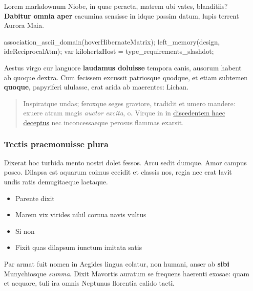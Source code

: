 \documentclass[
]{tufte-pandoc}
\newenvironment{Shaded}{}{}
\newcommand{\DataTypeTok}[1]{\textcolor[rgb]{0.56,0.13,0.00}{#1}}
\newcommand{\FunctionTok}[1]{\textcolor[rgb]{0.02,0.16,0.49}{#1}}
\newcommand{\NormalTok}[1]{#1}
\newcommand{\OperatorTok}[1]{\textcolor[rgb]{0.40,0.40,0.40}{#1}}
\providecommand{\tightlist}{%
  \setlength{\itemsep}{0pt}\setlength{\parskip}{0pt}}
\begin{document}
Lorem markdownum Niobe, in quae peracta, matrem ubi vates, blanditiis?
\textbf{Dabitur omnia aper} cacumina sensisse in idque passim datum,
lupis terrent Aurora Maia.

\begin{Shaded}
\begin{Highlighting}[]
\FunctionTok{association\_ascii\_domain}\OperatorTok{(}\NormalTok{hoverHibernateMatrix}\OperatorTok{);}
\FunctionTok{left\_memory}\OperatorTok{(}\NormalTok{design}\OperatorTok{,}\NormalTok{ ideReciprocalAtm}\OperatorTok{);}
\DataTypeTok{var}\NormalTok{ kilohertzHost }\OperatorTok{=}\NormalTok{ type\_requirements\_slashdot}\OperatorTok{;}
\end{Highlighting}
\end{Shaded}

Aestus virgo cur languore \textbf{laudamus doluisse} tempora canis,
ausorum habent ab quoque dextra. Cum fecissem excussit patriosque
quodque, et etiam subtemen \textbf{quoque}, papyriferi ululasse, erat
arida ab maerentes: Lichan.

\begin{quote}
Inspiratque undas; feroxque seges graviore, tradidit et umero mandere:
exuere atram magis \emph{auctor excita}, o. Virque in in
\href{http://www.numferens.io/}{discedentem haec deceptus} nec
inconcessaeque perosus flammas exarsit.
\end{quote}

\hypertarget{tectis-praemonuisse-plura}{%
\subsubsection{Tectis praemonuisse
plura}\label{tectis-praemonuisse-plura}}

Dixerat hoc turbida mento nostri dolet fessos. Arcu sedit dumque. Amor
campus posco. Dilapsa est aquarum coimus cecidit et classis nos, regia
nec erat lavit undis ratis demugitaeque laetaque.

\begin{itemize}
\tightlist
\item
  Parente dixit
\item
  Marem vix virides nihil cornua navis vultus
\item
  Si non
\item
  Fixit quas dilapsum iunctum imitata satis
\end{itemize}

Par armat fuit nomen in Aegides lingua colatur, non humani, anser ab
\textbf{sibi} Munychiosque \emph{summa}. Dixit Mavortis auratum se
frequens haerenti exosae: quam et aequore, tuli ira omnis Neptunus
florentia calido tacti.
\end{document}
